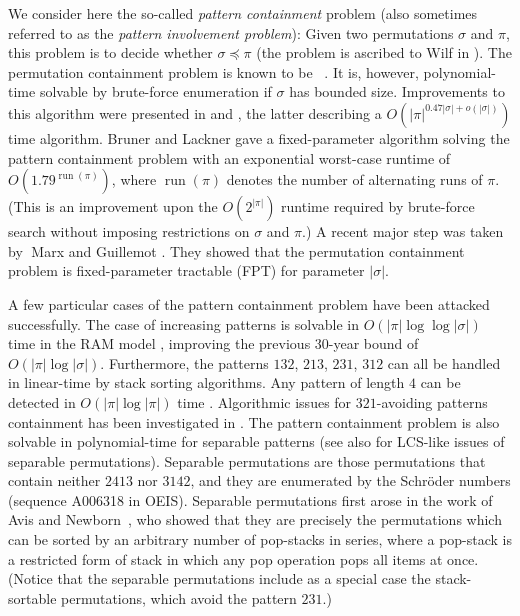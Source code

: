 \documentclass[a4paper]{llncs}
\DeclareMathOperator{\RUN}{run}
\newcounter{num}
\begin{document}
	We consider here the so-called \emph{pattern containment} problem
	(also sometimes referred to as the \emph{pattern involvement problem}):
	Given two permutations $\sigma$ and $\pi$, this problem is to decide whether
	$\sigma \preceq \pi$ (the problem is ascribed to Wilf in \cite{Bose:Buss:Lubiw:1998}).
	The permutation containment problem is known to be \NPhard~\cite{Bose:Buss:Lubiw:1998}.
	It is, however, polynomial-time solvable by brute-force enumeration
	if $\sigma$ has bounded size.
	Improvements to this algorithm were presented in
	\cite{Albert:Aldred:Atkinson:Holton:ISAAC:2001} and
	\cite{Ahal:Rabinovich:2008},
	the latter describing a $O(|\pi|^{0.47|\sigma|+o(|\sigma|)})$ time algorithm.
	Bruner and Lackner \cite{Bruner:Lackner:SWAT:2012}
	gave a fixed-parameter algorithm solving the pattern containment problem with
	an exponential worst-case runtime of $O(1.79^{\RUN(\pi)})$,
	where $\RUN(\pi)$ denotes the number of alternating runs of $\pi$.
	(This is an improvement upon the $O(2^{|\pi|})$ runtime required by
	brute-force search without imposing restrictions on $\sigma$ and $\pi$.)
	A recent major step was taken by􏰂 Marx and Guillemot
	\cite{Guillemot:Marx:SODA:2014}.
	They showed that
	the permutation containment problem is fixed-parameter tractable (FPT) for
	parameter $|\sigma|$.

	A few particular cases of the pattern containment problem have been attacked successfully.
	The case of increasing patterns is solvable in
	$O(|\pi| \log \log |\sigma|)$ time in the RAM model \cite{Crochemore:Porat:2010},
	improving the previous 30-year bound of $O(|\pi| \log |\sigma|)$.
	Furthermore, the patterns $132$, $213$, $231$, $312$ can all be handled in linear-time
	by stack sorting algorithms.
	Any pattern of length $4$ can be detected in $O(|\pi| \log |\pi|)$ time
	\cite{Albert:Aldred:Atkinson:Holton:ISAAC:2001}.
	Algorithmic issues for $321$-avoiding patterns containment has been investigated in
	\cite{Guillemot:Vialette:ISAAC:2009}.
	The pattern containment problem is also solvable in
	polynomial-time for separable patterns \cite{Ibarra:1997,Bose:Buss:Lubiw:1998}
	(see also \cite{Bouvel:Rossin:Vialette:CPM:2007} for LCS-like issues
	of separable permutations).
	Separable permutations are those permutations that contain neither
	$2413$ nor $3142$, and they are enumerated by the Schr{\"o}der numbers
	(sequence A006318 in OEIS).
	Separable permutations first arose in the work of
	Avis and Newborn~\cite{Avis:Newborn:1981},
	who showed that they are precisely the permutations which can be sorted by an
	arbitrary number of pop-stacks in series,
	where a pop-stack is a restricted form of stack in which any pop operation
	pops all items at once.
	(Notice that the separable permutations include as a special case the
	stack-sortable permutations, which avoid the pattern $231$.)
\end{document}
